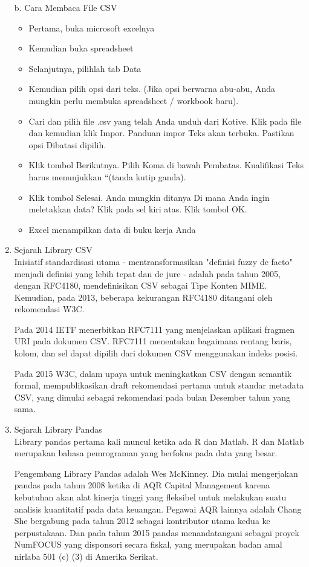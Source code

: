 \begin{enumerate}
b. Cara Membaca File CSV 
\begin{itemize}
\item Pertama, buka microsoft excelnya
\item Kemudian buka spreadsheet
\item Selanjutnya, pilihlah tab Data
\item Kemudian pilih opsi dari teks. (Jika opsi berwarna abu-abu, Anda mungkin perlu membuka spreadsheet / workbook baru).
\item Cari dan pilih file .csv yang telah Anda unduh dari Kotive. Klik pada file dan kemudian klik Impor.
Panduan impor Teks akan terbuka. Pastikan opsi Dibatasi dipilih.
\item Klik tombol Berikutnya. Pilih Koma di bawah Pembatas. Kualifikasi Teks harus menunjukkan “(tanda kutip ganda).
\item Klik tombol Selesai.
Anda mungkin ditanya Di mana Anda ingin meletakkan data? Klik pada sel kiri atas. Klik tombol OK.
\item Excel menampilkan data di buku kerja Anda
\end{itemize}

\item Sejarah Library CSV\\
Inisiatif standardisasi utama - mentransformasikan "definisi fuzzy de facto" menjadi definisi yang lebih tepat dan de jure - adalah pada tahun 2005, dengan RFC4180, mendefinisikan CSV sebagai Tipe Konten MIME. Kemudian, pada 2013, beberapa kekurangan RFC4180 ditangani oleh rekomendasi W3C.

Pada 2014 IETF menerbitkan RFC7111 yang menjelaskan aplikasi fragmen URI pada dokumen CSV. RFC7111 menentukan bagaimana rentang baris, kolom, dan sel dapat dipilih dari dokumen CSV menggunakan indeks posisi.

Pada 2015 W3C, dalam upaya untuk meningkatkan CSV dengan semantik formal, mempublikasikan draft rekomendasi pertama untuk standar metadata CSV, yang dimulai sebagai rekomendasi pada bulan Desember tahun yang sama.
\item Sejarah Library Pandas\\
Library pandas pertama kali muncul ketika ada R dan Matlab. R dan Matlab merupakan bahasa pemrograman yang berfokus pada data yang besar. 

Pengembang Library Pandas adalah Wes McKinney. Dia mulai mengerjakan pandas pada tahun 2008 ketika di AQR Capital Management karena kebutuhan akan alat kinerja tinggi yang fleksibel untuk melakukan suatu analisis kuantitatif pada data keuangan. Pegawai AQR lainnya adalah Chang She bergabung pada tahun 2012 sebagai kontributor utama kedua ke perpustakaan. Dan pada tahun 2015 pandas menandatangani sebagai proyek NumFOCUS yang disponsori secara fiskal, yang merupakan badan amal nirlaba 501 (c) (3) di Amerika Serikat.


\end{enumerate}
